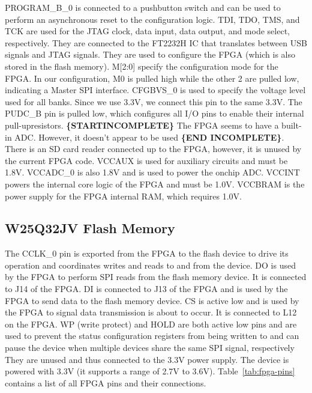 PROGRAM\_B\_0 is connected to a pushbutton switch and can be used to perform an asynchronous reset
to the configuration logic. TDI, TDO, TMS, and TCK are used for the JTAG clock, data input, data
output, and mode select, respectively. They are connected to the FT2232H IC that translates between
USB signals and JTAG signals. They are used to configure the FPGA (which is also stored in the flash
memory). M[2:0] specify the configuration mode for the FPGA. In our configuration, M0 is pulled high
while the other 2 are pulled low, indicating a Master SPI interface. CFGBVS\_0 is used to specify
the voltage level used for all banks. Since we use 3.3V, we connect this pin to the same 3.3V. The
PUDC\_B pin is pulled low, which configures all I/O pins to enable their internal
pull-upresistors. \textbf{\{STARTINCOMPLETE\}} The FPGA seems to have a built-in ADC. However, it
doesn't appear to be used \textbf{\{END INCOMPLETE\}}. There is an SD card reader connected up to
the FPGA, however, it is unused by the current FPGA code. VCCAUX is used for auxiliary circuits and
must be 1.8V. VCCADC\_0 is also 1.8V and is used to power the onchip ADC. VCCINT powers the internal
core logic of the FPGA and must be 1.0V. VCCBRAM is the power supply for the FPGA internal RAM,
which requires 1.0V.

\subsection{W25Q32JV Flash Memory}
\label{sec:w25q32jv}

The CCLK\_0 pin is exported from the FPGA to the flash device to drive its operation and coordinates
writes and reads to and from the device. DO is used by the FPGA to perform SPI reads from the flash
memory device. It is connected to J14 of the FPGA. DI is connected to J13 of the FPGA and is used by
the FPGA to send data to the flash memory device. CS is active low and is used by the FPGA to signal
data transmission is about to occur. It is connected to L12 on the FPGA. WP (write protect) and HOLD
are both active low pins and are used to prevent the status configuration registers from being
written to and can pause the device when multiple devices share the same SPI signal, respectively
They are unused and thus connected to the 3.3V power supply. The device is powered with 3.3V (it
supports a range of 2.7V to 3.6V). Table~\ref{tab:fpga-pins} contains a list of all FPGA pins and
their connections.

